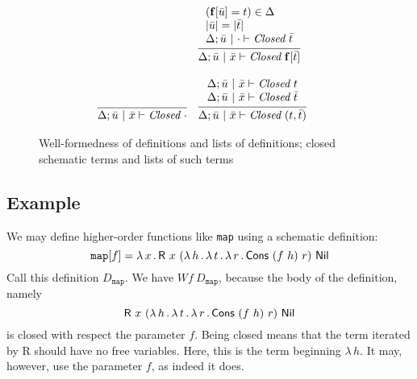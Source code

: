 \documentclass{article}
\begin{document}
\begin{figure}
\[\begin{array}{lll}
   &\infer{\Delta;\bar{u}\ |\ \bar{x}\vdash\textit{Closed}\ \mathbf{f}[\bar{t}]}
        {\begin{array}{l}
             (\mathbf{f}[\bar{u}] = t) \in \Delta \\
            |\bar{u}| = |\bar{t}| \\
           \Delta;\bar{u}\ |\ \cdot \vdash \textit{Closed}\ \bar{t}
         \end{array}} 
\\ \\
\infer{\Delta;\bar{u}\ |\ \bar{x}\vdash \textit{Closed}\ \cdot}{\ }&
\infer{\Delta;\bar{u}\ |\ \bar{x}\vdash \textit{Closed}\ (t,\bar{t})}
  {\begin{array}{l}
    \Delta;\bar{u}\ |\ \bar{x}\vdash \textit{Closed}\ t \\
    \Delta;\bar{u}\ |\ \bar{x}\vdash \textit{Closed}\ \bar{t}
\end{array}}&\ 
   \end{array}
  \]
  \caption{Well-formedness of definitions and lists of definitions; closed schematic terms and lists of such terms}
\label{fig:sarwf}
\end{figure}

\subsection{Example}

We may define higher-order functions like \texttt{map} using a schematic definition:
\[
\texttt{map}[f] = \lam{x}{\mathsf{R}\ x\ (\lam{h}{\lam{t}{\lam{r}{\mathsf{Cons}\ (f\ h)\ r}}})\ \mathsf{Nil}}
\]
\noindent Call this definition $D_{\texttt{map}}$.  We have $\textit{Wf}\ D_{\texttt{map}}$, because the
body of the definition, namely
\[
\mathsf{R}\ x\ (\lam{h}{\lam{t}{\lam{r}{\mathsf{Cons}\ (f\ h)\ r}}})\ \mathsf{Nil}
\]
\noindent is closed with respect the parameter $f$.  Being closed
means that the term iterated by \textsf{R} should have no free
variables.  Here, this is the term beginning $\lambda\, h$.  It may,
however, use the parameter $f$, as indeed it does.
\end{document}
